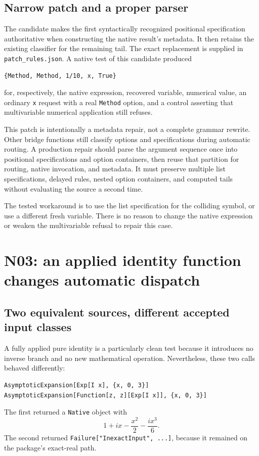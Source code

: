\documentclass[11pt]{article}
\newcommand{\code}[1]{\texttt{#1}}
\begin{document}
\subsection{Narrow patch and a proper parser}
The candidate makes the first syntactically recognized positional specification authoritative when constructing the native result's metadata. It then retains the existing classifier for the remaining tail. The exact replacement is supplied in \code{patch\_rules.json}. A native test of this candidate produced
\begin{lstlisting}
{Method, Method, 1/10, x, True}
\end{lstlisting}
for, respectively, the native expression, recovered variable, numerical value, an ordinary \code{x} request with a real \code{Method} option, and a control asserting that multivariable numerical application still refuses.

This patch is intentionally a metadata repair, not a complete grammar rewrite. Other bridge functions still classify options and specifications during automatic routing. A production repair should parse the argument sequence once into positional specifications and option containers, then reuse that partition for routing, native invocation, and metadata. It must preserve multiple list specifications, delayed rules, nested option containers, and computed tails without evaluating the source a second time.

The tested workaround is to use the list specification for the colliding symbol, or use a different fresh variable. There is no reason to change the native expression or weaken the multivariable refusal to repair this case.

\section{N03: an applied identity function changes automatic dispatch}
\label{sec:n03}
\subsection{Two equivalent sources, different accepted input classes}
A fully applied pure identity is a particularly clean test because it introduces no inverse branch and no new mathematical operation. Nevertheless, these two calls behaved differently:
\begin{lstlisting}
AsymptoticExpansion[Exp[I x], {x, 0, 3}]
AsymptoticExpansion[Function[z, z][Exp[I x]], {x, 0, 3}]
\end{lstlisting}
The first returned a \code{Native} object with
\[
1+ix-\frac{x^2}{2}-\frac{i x^3}{6}.
\]
The second returned \code{Failure["InexactInput", ...]}, because it remained on the package's exact-real path.
\end{document}
